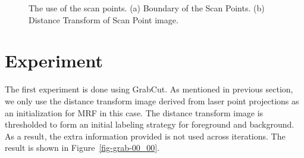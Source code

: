 \documentclass{article} %
\begin{document}
\begin{figure}[h]
\begin{center}
\end{center}
\caption{The use of the scan points. (a) Boundary of the Scan
  Points. (b) Distance Transform of Scan Point image.}
\label{fig:data_usage}
\end{figure}

\section{Experiment}
\label{sec:exp}

The first experiment is done using GrabCut. As mentioned in previous section, we only use the distance transform image derived from laser point projections as an initialization for MRF in this case. The distance transform image is thresholded to form an initial labeling strategy for foreground and background. As a result, the extra information provided is not used across iterations. The result is shown in Figure~\ref{fig-grab-00_00}. 
\end{document}

